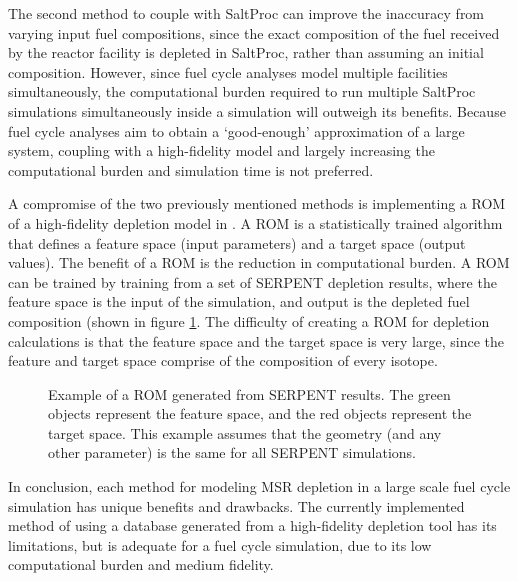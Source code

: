 The second method to couple \Cyclus with SaltProc can improve
the inaccuracy from varying input fuel compositions, since
the exact composition of the fuel received by the reactor facility
is depleted in SaltProc, rather than assuming an initial
composition. However,
since fuel cycle analyses model multiple facilities simultaneously,
the computational burden required to run multiple SaltProc
simulations simultaneously inside a \Cyclus simulation
will outweigh its benefits. Because fuel cycle
analyses aim to obtain a `good-enough' approximation of a large
system, coupling \Cyclus with a high-fidelity model and
largely increasing the computational burden and simulation
time is not preferred.

A compromise of the two previously mentioned methods
is implementing a \gls{ROM} of a high-fidelity
depletion model in \Cyclus. 
A \gls{ROM} is a statistically trained algorithm that
defines a feature space (input parameters) and a
target space (output values).
The benefit of a \gls{ROM} is the reduction in computational
burden. A \gls{ROM} can be trained by training from a set of
SERPENT depletion results, where the feature space is the
input of the simulation, and output is the depleted fuel
composition (shown in figure \ref{diag:rom_flow}. 
The difficulty of creating a \gls{ROM} for depletion calculations
is that the feature space and the target space is very large, since
the feature and target space comprise of the composition of
every isotope.


\begin{figure}
    \centering
    \caption{Example of a \gls{ROM} generated from SERPENT
             results. The green objects represent the feature
             space, and the red objects represent the
             target space. This example assumes that the
             geometry (and any other parameter) is the same for all SERPENT simulations.}
    \label{diag:rom_flow}
\end{figure}

In conclusion, each method for modeling \gls{MSR} depletion
in a large scale fuel cycle simulation has unique
benefits and drawbacks. The currently implemented method
of using a database generated from a high-fidelity depletion
tool has its limitations, but is adequate for a fuel cycle simulation,
due to its low computational burden and medium fidelity.